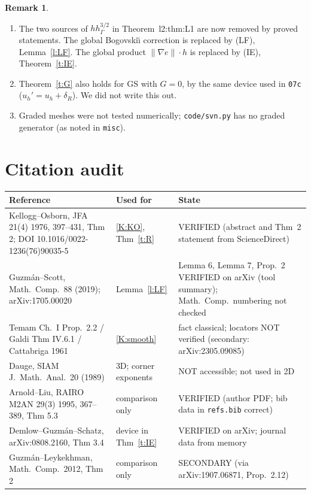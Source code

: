 \documentclass[11pt,reqno]{amsart}
\theoremstyle{plain}
\theoremstyle{definition}
\newtheorem{remark}[theorem]{Remark}
\newcommand{\hG}{h_\Gamma}
\newcommand{\norm}[1]{\lVert #1\rVert}
\newcommand{\GS}{\mathrm{GS}}
\begin{document}
\begin{remark}
\begin{enumerate}[label=(\arabic*)]
\item The two sources of $h\hG^{3/2}$ in Theorem~l2:thm:L1 are now removed by proved statements. The global Bogovski\u\i{} correction is replaced by (LF), Lemma~\ref{l:LF}. The global product $\norm{\nabla e}\cdot h$ is replaced by (IE), Theorem~\ref{t:IE}.
\item Theorem~\ref{t:G} also holds for $\GS$ with $G=0$, by the same device used in \texttt{07c} ($u_h'=u_h+\delta_R$). We did not write this out.
\item Graded meshes were not tested numerically; \texttt{code/svn.py} has no graded generator (as noted in \texttt{misc}).
\end{enumerate}
\end{remark}

\section{Citation audit}

\begin{center}\footnotesize
\begin{tabular}{>{\raggedright\arraybackslash}p{}>{\raggedright\arraybackslash}p{}>{\raggedright\arraybackslash}p{}}
\toprule
Reference & Used for & State\\
\midrule
Kellogg--Osborn, JFA 21(4) 1976, 397--431, Thm 2; DOI 10.1016/0022-1236(76)90035-5 & \ref{K:KO}, Thm~\ref{t:R} & VERIFIED (abstract and Thm~2 statement from ScienceDirect)\\
Guzm\'an--Scott, Math.\ Comp.\ 88 (2019); arXiv:1705.00020 & Lemma~\ref{l:LF} & Lemma 6, Lemma 7, Prop.~2 VERIFIED on arXiv (tool summary); Math.\ Comp.\ numbering not checked\\
Temam Ch.~I Prop.~2.2 / Galdi Thm IV.6.1 / Cattabriga 1961 & \ref{K:smooth} & fact classical; locators NOT verified (secondary: arXiv:2305.09085)\\
Dauge, SIAM J.\ Math.\ Anal.\ 20 (1989) & 3D; corner exponents & NOT accessible; not used in 2D\\
Arnold--Liu, RAIRO M2AN 29(3) 1995, 367--389, Thm 5.3 & comparison only & VERIFIED (author PDF; bib data in \texttt{refs.bib} correct)\\
Demlow--Guzm\'an--Schatz, arXiv:0808.2160, Thm 3.4 & device in Thm~\ref{t:IE} & VERIFIED on arXiv; journal data from memory\\
Guzm\'an--Leykekhman, Math.\ Comp.\ 2012, Thm 2 & comparison only & SECONDARY (via arXiv:1907.06871, Prop.~2.12)\\
\bottomrule
\end{tabular}
\end{center}
\end{document}
